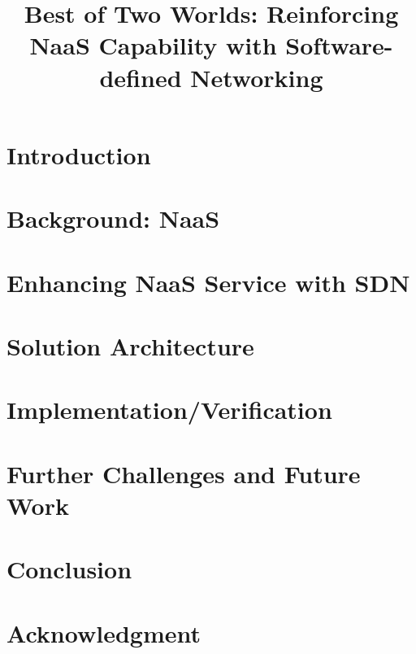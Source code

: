 \documentclass[a4paper,twocolumn,conference]{IEEEtran}
\begin{document}

\title{Best of Two Worlds: Reinforcing NaaS Capability with Software-defined Networking}


\author{


}

\maketitle


\begin{abstract}
	
\end{abstract}

\IEEEpeerreviewmaketitle

\section{Introduction}
	

\section{Background: NaaS}
	

\section{Enhancing NaaS Service with SDN}
	

\section{Solution Architecture}
	

\section{Implementation/Verification}
	

\section{Further Challenges and Future Work}
	

\section{Conclusion}


\section*{Acknowledgment}



\end{document}
